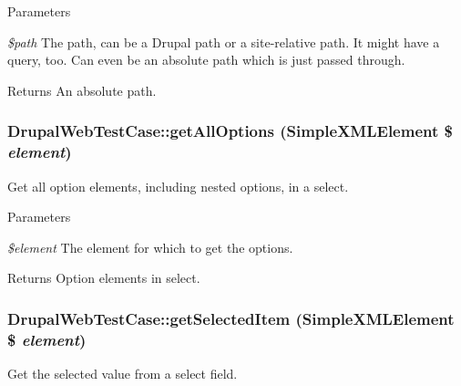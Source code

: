 \begin{DoxyParams}{Parameters}
\item[{\em \$path}]The path, can be a Drupal path or a site-\/relative path. It might have a query, too. Can even be an absolute path which is just passed through. \end{DoxyParams}
\begin{DoxyReturn}{Returns}
An absolute path. 
\end{DoxyReturn}
\hypertarget{class_drupal_web_test_case_a242a13b4aaf558f5b4030c0ad2b3789c}{
\subsubsection[{getAllOptions}]{\setlength{\rightskip}{0pt plus 5cm}DrupalWebTestCase::getAllOptions (SimpleXMLElement \$ {\em element})}}
\label{class_drupal_web_test_case_a242a13b4aaf558f5b4030c0ad2b3789c}
Get all option elements, including nested options, in a select.


\begin{DoxyParams}{Parameters}
\item[{\em \$element}]The element for which to get the options. \end{DoxyParams}
\begin{DoxyReturn}{Returns}
Option elements in select. 
\end{DoxyReturn}
\hypertarget{class_drupal_web_test_case_a4f24b7eddfb7d495f4ad8592f0b24929}{
\subsubsection[{getSelectedItem}]{\setlength{\rightskip}{0pt plus 5cm}DrupalWebTestCase::getSelectedItem (SimpleXMLElement \$ {\em element})}}
\label{class_drupal_web_test_case_a4f24b7eddfb7d495f4ad8592f0b24929}
Get the selected value from a select field.



